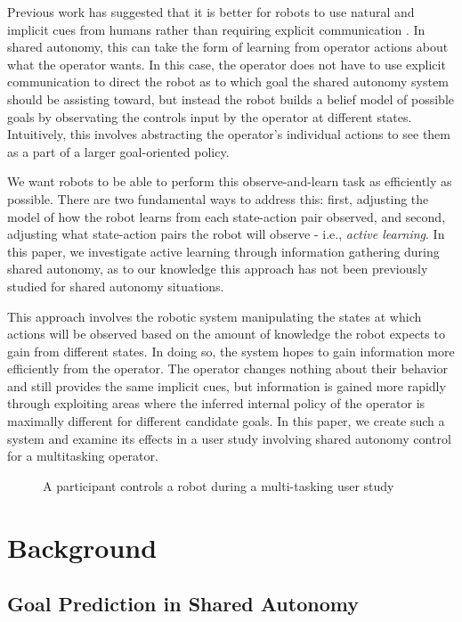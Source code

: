 \documentclass[conference]{IEEEtran}
\begin{document}
Previous work has suggested that it is better for robots to use natural and implicit cues from humans rather than requiring explicit communication \cite{goodrich2003seven}. In shared autonomy, this can take the form of learning from operator actions about what the operator wants. In this case, the operator does not have to use explicit communication to direct the robot as to which goal the shared autonomy system should be assisting toward, but instead the robot builds a belief model of possible goals by observating the controls input by the operator at different states. Intuitively, this involves abstracting the operator's individual actions to see them as a part of a larger goal-oriented policy.

We want robots to be able to perform this observe-and-learn task as efficiently as possible. There are two fundamental ways to address this: first, adjusting the model of how the robot learns from each state-action pair observed, and second, adjusting what state-action pairs the robot will observe - i.e., \textit{active learning}. In this paper, we investigate active learning through information gathering during shared autonomy, as to our knowledge this approach has not been previously studied for shared autonomy situations.

This approach involves the robotic system manipulating the states at which actions will be observed based on the amount of knowledge the robot expects to gain from different states. In doing so, the system hopes to gain information more efficiently from the operator. The operator changes nothing about their behavior and still provides the same implicit cues, but information is gained more rapidly through exploiting areas where the inferred internal policy of the operator is maximally different for different candidate goals. In this paper, we create such a system and examine its effects in a user study involving shared autonomy control for a multitasking operator.

\begin{figure}
\caption{A participant controls a robot during a multi-tasking user study}
\label{teaser}
\end{figure}

\section{Background}
\subsection{Goal Prediction in Shared Autonomy}
\end{document}
